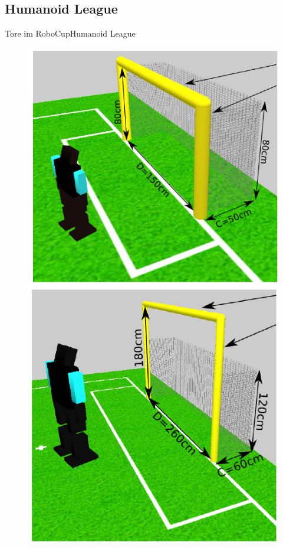 \documentclass{beamer}
\begin{document}
\subsection{Humanoid League}
\begin{frame}{Tore im RoboCup}{Humanoid League}
\begin{figure}[htp]
\centering
\includegraphics[scale=0.45]{humanoid-kidsize-goal.png}
\includegraphics[scale=0.45]{humanoid-adultsize-goal.png}
\end{figure}
\end{frame}
\end{document}
